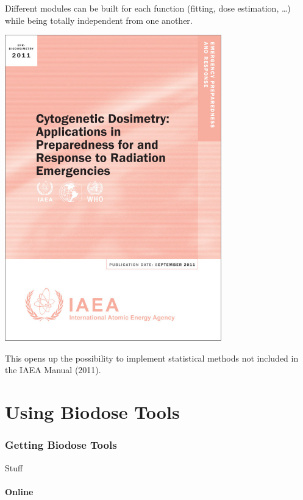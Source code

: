 \documentclass[]{scrartcl}
\begin{document}
Different modules can be built for each function (fitting, dose estimation, \ldots) while being totally independent from one another.

\begin{center}\includegraphics[width=355px]{images/stats/iaea-cover} \end{center}

This opens up the possibility to implement statistical methods not included in the IAEA Manual (2011).

\hypertarget{part-using-biodose-tools}{%
\part{Using Biodose Tools}\label{part-using-biodose-tools}}

\hypertarget{get}{%
\section{Getting Biodose Tools}\label{get}}

Stuff

\hypertarget{get-online}{%
\subsection{Online}\label{get-online}}
\end{document}
